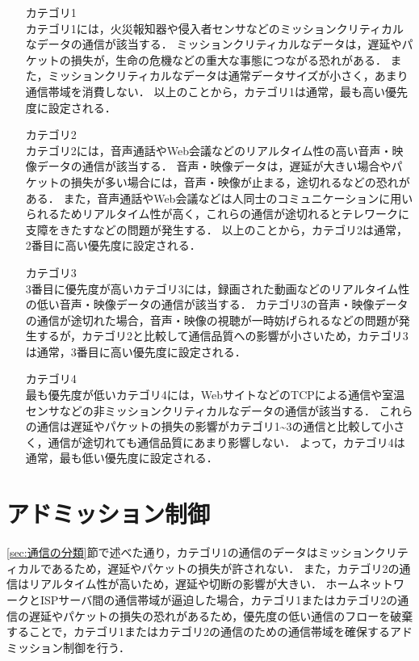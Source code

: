\documentclass[a4paper,11pt,uplatex]{ujreport}
\begin{document}
  \begin{itemize}
    \setlength{\leftskip}{1.0cm}
    \item[カテゴリ1]\mbox{}\\
          カテゴリ1には，火災報知器や侵入者センサなどのミッションクリティカルなデータの通信が該当する．
          ミッションクリティカルなデータは，遅延やパケットの損失が，生命の危機などの重大な事態につながる恐れがある．
          また，ミッションクリティカルなデータは通常データサイズが小さく，あまり通信帯域を消費しない．
          以上のことから，カテゴリ1は通常，最も高い優先度に設定される．
    \item[カテゴリ2]\mbox{}\\
          カテゴリ2には，音声通話やWeb会議などのリアルタイム性の高い音声・映像データの通信が該当する．
          音声・映像データは，遅延が大きい場合やパケットの損失が多い場合には，音声・映像が止まる，途切れるなどの恐れがある．
          また，音声通話やWeb会議などは人同士のコミュニケーションに用いられるためリアルタイム性が高く，これらの通信が途切れるとテレワークに支障をきたすなどの問題が発生する．
          以上のことから，カテゴリ2は通常，2番目に高い優先度に設定される．
    \item[カテゴリ3]\mbox{}\\
          3番目に優先度が高いカテゴリ3には，録画された動画などのリアルタイム性の低い音声・映像データの通信が該当する．
          カテゴリ3の音声・映像データの通信が途切れた場合，音声・映像の視聴が一時妨げられるなどの問題が発生するが，カテゴリ2と比較して通信品質への影響が小さいため，カテゴリ3は通常，3番目に高い優先度に設定される．
    \item[カテゴリ4]\mbox{}\\   
          最も優先度が低いカテゴリ4には，WebサイトなどのTCPによる通信や室温センサなどの非ミッションクリティカルなデータの通信が該当する．
          これらの通信は遅延やパケットの損失の影響がカテゴリ1\textasciitilde3の通信と比較して小さく，通信が途切れても通信品質にあまり影響しない．
          よって，カテゴリ4は通常，最も低い優先度に設定される．

  \end{itemize}

\section{アドミッション制御}
\label{sec:アドミッション制御}

  \ref{sec:通信の分類}節で述べた通り，カテゴリ1の通信のデータはミッションクリティカルであるため，遅延やパケットの損失が許されない．
  また，カテゴリ2の通信はリアルタイム性が高いため，遅延や切断の影響が大きい．
  ホームネットワークとISPサーバ間の通信帯域が逼迫した場合，カテゴリ1またはカテゴリ2の通信の遅延やパケットの損失の恐れがあるため，優先度の低い通信のフローを破棄することで，カテゴリ1またはカテゴリ2の通信のための通信帯域を確保するアドミッション制御を行う．\par
\end{document}
